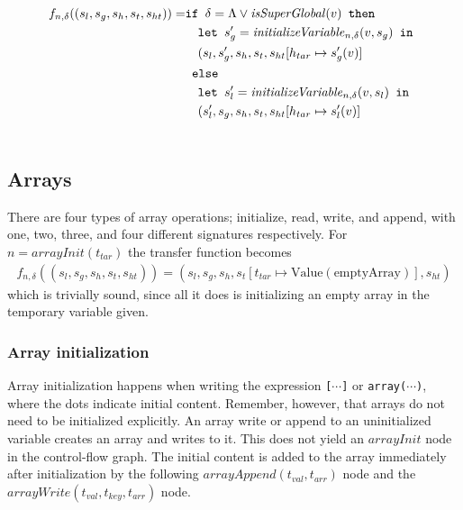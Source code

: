 \begin{align}
f_{n, \delta} ((s_l,s_g,s_h,s_t, s_{ht})) = &\texttt{if }\delta= \Lambda \vee \mathit{isSuperGlobal}(v)\texttt{ then } \notag\\
                                            &\quad\texttt{let }  s_g' = \mathit{initializeVariable}_{n,\delta}(v,s_g) \texttt{ in }\notag\\
                                            &\quad (s_l, s_g', s_h, s_t, s_{ht}[h_{tar}\mapsto s_g'(v)]\notag\\
                                            & \texttt{ else } \notag\\
                                            &\quad\texttt{let }  s_l' = \mathit{initializeVariable}_{n,\delta}(v,s_l) \texttt{ in }\notag\\
                                            &\quad (s_l', s_g, s_h, s_t, s_{ht}[h_{tar}\mapsto s_l'(v)]\notag\\
                                            &
\end{align}

\subsection{Arrays}

There are four types of array operations; initialize, read, write, and append, with one, two, three, and four different signatures respectively. For $n = \mathit{arrayInit}(t_{tar})$ the transfer function becomes
\begin{align}
f_{n,\delta}((s_l, s_g, s_h, s_t, s_{ht})) = (s_l, s_g, s_h, s_t[t_{tar}\mapsto \text{Value}(\text{emptyArray})], s_{ht})
\end{align}
which is trivially sound, since all it does is initializing an empty array in the temporary variable given.

\subsubsection{Array initialization}
Array initialization happens when writing the expression \texttt{[$\cdots$]} or \texttt{array($\cdots$)}, where the dots indicate initial content. Remember, however, that arrays do not need to be initialized explicitly. An array write or append to an uninitialized variable creates an array and writes to it. This does not yield an $\mathit{arrayInit}$ node in the control-flow graph. The initial content is added to the array immediately after initialization by the following $\mathit{arrayAppend}(t_{val}, t_{arr})$ node and  the $\mathit{arrayWrite}(t_{val}, t_{key}, t_{arr})$ node.

